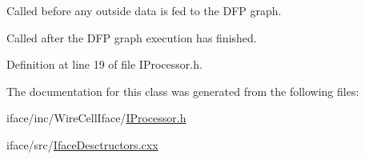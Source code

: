 Called before any outside data is fed to the D\+FP graph. 

Called after the D\+FP graph execution has finished. 

Definition at line 19 of file I\+Processor.\+h.



The documentation for this class was generated from the following files\+:\begin{DoxyCompactItemize}
\item 
iface/inc/\+Wire\+Cell\+Iface/\hyperlink{_i_processor_8h}{I\+Processor.\+h}\item 
iface/src/\hyperlink{_iface_desctructors_8cxx}{Iface\+Desctructors.\+cxx}\end{DoxyCompactItemize}
